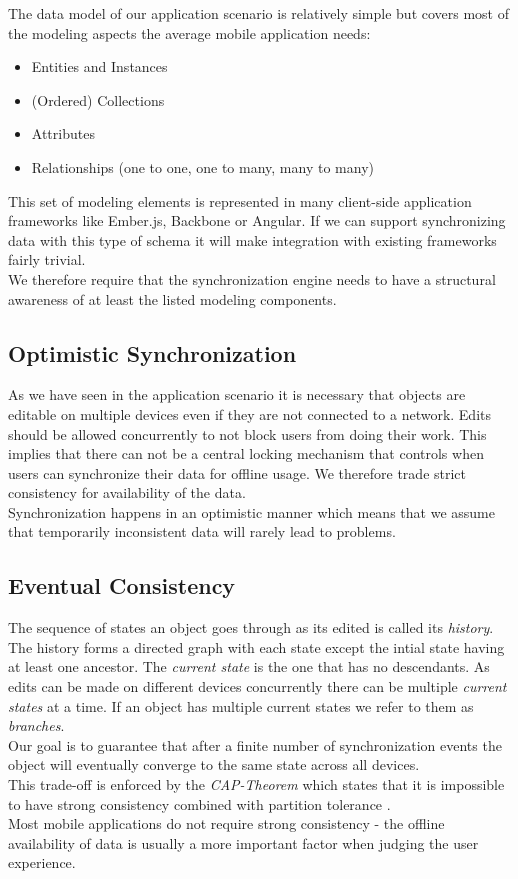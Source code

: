 The data model of our application scenario is relatively simple but covers most of the modeling aspects the average mobile application needs:

\begin{itemize}
\item Entities and Instances
\item (Ordered) Collections
\item Attributes
\item Relationships (one to one, one to many, many to many)
\end{itemize}

This set of modeling elements is represented in many client-side application frameworks like Ember.js, Backbone or Angular.
If we can support synchronizing data with this type of schema it will make integration with existing frameworks fairly trivial.\\
We therefore require that the synchronization engine needs to have a structural awareness of at least the listed modeling components.

\subsection{Optimistic Synchronization}
As we have seen in the application scenario it is necessary that objects are editable on multiple devices even if they are not connected to a network.
Edits should be allowed concurrently to not block users from doing their work.
This implies that there can not be a central locking mechanism that controls when users can synchronize their data for offline usage.
We therefore trade strict consistency for availability of the data.\\
Synchronization happens in an optimistic manner which means that we assume that temporarily inconsistent data will rarely lead to problems.

\subsection{Eventual Consistency}
The sequence of states an object goes through as its edited is called its \emph{history}.
The history forms a directed graph with each state except the intial state having at least one ancestor.
The \emph{current state} is the one that has no descendants.
As edits can be made on different devices concurrently there can be multiple \emph{current states} at a time.
If an object has multiple current states we refer to them as \emph{branches}.\\
Our goal is to guarantee that after a finite number of synchronization events the object will eventually converge to the same state across all devices.\\
This trade-off is enforced by the \emph{CAP-Theorem} which states that it is impossible to have strong consistency combined with partition tolerance \cite{Gilbert:2002uw}.\\
Most mobile applications do not require strong consistency - the offline availability of data is usually a more important factor when judging the user experience. 

